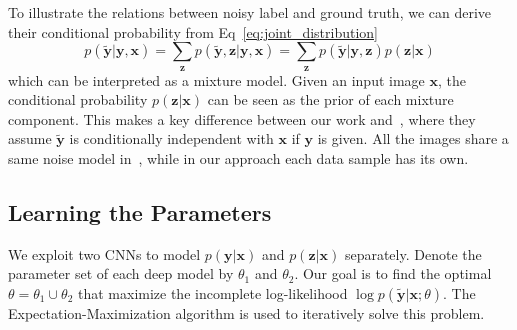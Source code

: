 \documentclass[10pt,twocolumn,letterpaper]{article}
\def\vec{\mathbf}
\begin{document}
To illustrate the relations between noisy label and ground truth, we can derive their conditional probability from Eq~\ref{eq:joint_distribution}
\begin{equation}
    p(\tilde{\vec{y}} | \vec{y}, \vec{x}) = \sum_{\vec{z}} p(\tilde{\vec{y}}, \vec{z} | \vec{y}, \vec{x}) = \sum_{\vec{z}} p(\tilde{\vec{y}} | \vec{y}, \vec{z}) p(\vec{z} | \vec{x})
\end{equation}
which can be interpreted as a mixture model. Given an input image $\vec{x}$, the conditional probability $p(\vec{z} | \vec{x})$ can be seen as the prior of each mixture component. This makes a key difference between our work and~\cite{sukhbaatar2014learning}, where they assume $\tilde{\vec{y}}$ is conditionally independent with $\vec{x}$ if $\vec{y}$ is given. All the images share a same noise model in~\cite{sukhbaatar2014learning}, while in our approach each data sample has its own.

\subsection{Learning the Parameters} %
\label{sub:learning_the_parameters}
We exploit two CNNs to model $p(\vec{y} | \vec{x})$ and $p(\vec{z} | \vec{x})$ separately. Denote the parameter set of each deep model by $\theta_1$ and $\theta_2$. Our goal is to find the optimal $\theta = \theta_1 \cup \theta_2$ that maximize the incomplete log-likelihood $\log p(\tilde{\vec{y}} | \vec{x}; \theta)$. The Expectation-Maximization algorithm is used to iteratively solve this problem.
\end{document}
